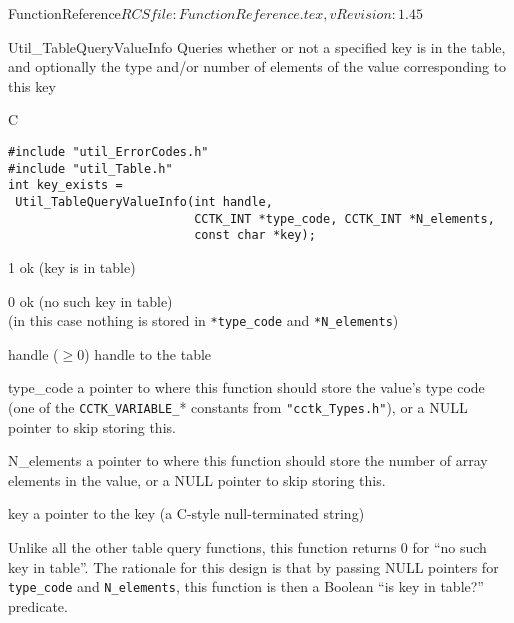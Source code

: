 \begin{cactuspart}{5}{FunctionReference}{$RCSfile: FunctionReference.tex,v $}{$Revision: 1.45 $}

\begin{FunctionDescription}{Util\_TableQueryValueInfo}
\label{Util-TableQueryValueInfo}
Queries whether or not a specified key is in the table, and optionally
the type and/or number of elements of the value corresponding to this key

\begin{Synopsis}{C}
\begin{verbatim}
#include "util_ErrorCodes.h"
#include "util_Table.h"
int key_exists =
 Util_TableQueryValueInfo(int handle,
                          CCTK_INT *type_code, CCTK_INT *N_elements,
                          const char *key);
\end{verbatim}
\end{Synopsis}

\begin{Result}{\rm 1}
ok (key is in table)
\end{Result}
\begin{Result}{\rm 0}
ok (no such key in table)\\
(in this case nothing is stored in \verb|*type_code| and \verb|*N_elements|)
\end{Result}

\begin{Parameter}{handle ($\ge 0$)}
handle to the table
\end{Parameter}
\begin{Parameter}{type\_code}
a pointer to where this function should store the value's type code
(one of the \verb|CCTK_VARIABLE_|* constants from \verb|"cctk_Types.h"|),
or a NULL pointer to skip storing this.
\end{Parameter}
\begin{Parameter}{N\_elements}
a pointer to where this function should store
the number of array elements in the value,
or a NULL pointer to skip storing this.
\end{Parameter}
\begin{Parameter}{key}
a pointer to the key (a C-style null-terminated string)
\end{Parameter}

\begin{Discussion}
Unlike all the other table query functions, this function returns
0 for ``no such key in table''.  The rationale for this design is that
by passing NULL pointers for \verb|type_code| and \verb|N_elements|, this
function is then a Boolean ``is key in table?'' predicate.
\end{Discussion}


\end{FunctionDescription}
\end{cactuspart}
